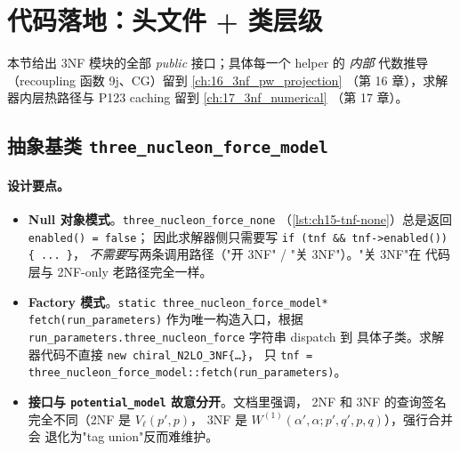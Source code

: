 \section{代码落地：头文件 + 类层级}
\label{sec:ch15-code}

本节给出 3NF 模块的全部 \emph{public} 接口；具体每一个 helper 的
\emph{内部} 代数推导（recoupling 函数 9j、CG）留到 \cref{ch:16_3nf_pw_projection}
（第 16 章），求解器内层热路径与 P123 caching 留到 \cref{ch:17_3nf_numerical}
（第 17 章）。

\subsection{抽象基类 \texttt{three\_nucleon\_force\_model}}
\label{subsec:ch15-abstract-base}



\paragraph{设计要点。}
\begin{itemize}
\item \textbf{Null 对象模式}。\texttt{three\_nucleon\_force\_none}
      （\cref{lst:ch15-tnf-none}）总是返回 \texttt{enabled() = false}；
      因此求解器侧只需要写 \texttt{if (tnf \&\& tnf->enabled()) \{ ... \}}，
      \emph{不需要}写两条调用路径（"开 3NF" / "关 3NF"）。"关 3NF"在
      代码层与 2NF-only 老路径完全一样。
\item \textbf{Factory 模式}。\texttt{static three\_nucleon\_force\_model*
      fetch(run\_parameters)} 作为唯一构造入口，根据
      \texttt{run\_parameters.three\_nucleon\_force} 字符串 dispatch 到
      具体子类。求解器代码不直接 \texttt{new chiral\_N2LO\_3NF\{\ldots\}}，
      只 \texttt{tnf = three\_nucleon\_force\_model::fetch(run\_parameters)}。
\item \textbf{接口与 \texttt{potential\_model} 故意分开}。文档里强调，
      2NF 和 3NF 的查询签名完全不同（2NF 是 \(V_\ell(p', p)\)，
      3NF 是 \(W^{(1)}(\alpha', \alpha; p', q', p, q)\)），强行合并会
      退化为"tag union"反而难维护。
\end{itemize}

